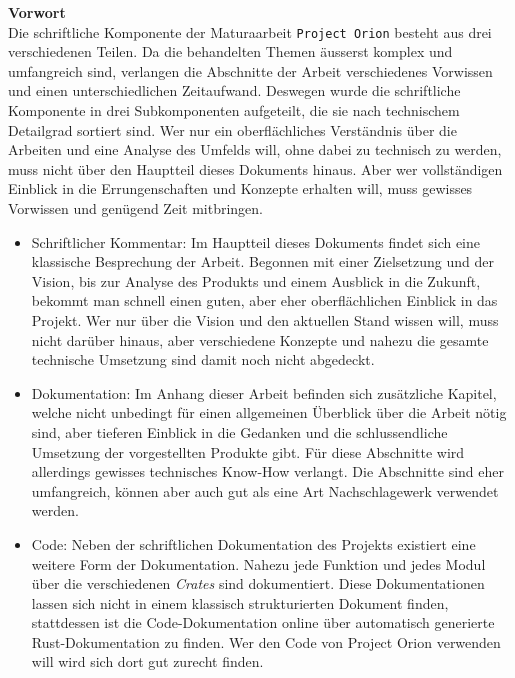 \documentclass[a4paper,11pt,titlepage,twoside]{memoir}
\begin{document}
\textbf{Vorwort}\\
Die schriftliche Komponente der Maturaarbeit \texttt{Project Orion} besteht aus
drei verschiedenen Teilen. Da die behandelten Themen äusserst komplex
und umfangreich sind, verlangen die Abschnitte der Arbeit
verschiedenes Vorwissen und einen unterschiedlichen Zeitaufwand.
Deswegen wurde die schriftliche Komponente in drei Subkomponenten
aufgeteilt, die sie nach technischem Detailgrad sortiert sind. Wer nur
ein oberflächliches Verständnis über die Arbeiten und eine Analyse des
Umfelds will, ohne dabei zu technisch zu werden, muss nicht über den
Hauptteil dieses Dokuments hinaus. Aber wer vollständigen Einblick in
die Errungenschaften und Konzepte erhalten will, muss gewisses
Vorwissen und genügend Zeit mitbringen.
\begin{itemize}
\item Schriftlicher Kommentar: Im Hauptteil dieses Dokuments findet sich
eine klassische Besprechung der Arbeit. Begonnen mit einer
Zielsetzung und der Vision, bis zur Analyse des Produkts und einem
Ausblick in die Zukunft, bekommt man schnell einen guten, aber eher
oberflächlichen Einblick in das Projekt. Wer nur über die Vision und
den aktuellen Stand wissen will, muss nicht darüber hinaus, aber
verschiedene Konzepte und nahezu die gesamte technische Umsetzung
sind damit noch nicht abgedeckt.
\item Dokumentation: Im Anhang dieser Arbeit befinden sich zusätzliche
Kapitel, welche nicht unbedingt für einen allgemeinen Überblick über
die Arbeit nötig sind, aber tieferen Einblick in die Gedanken und
die schlussendliche Umsetzung der vorgestellten Produkte gibt. Für
diese Abschnitte wird allerdings gewisses technisches Know-How
verlangt. Die Abschnitte sind eher umfangreich, können aber auch gut
als eine Art Nachschlagewerk verwendet werden.
\item Code: Neben der schriftlichen Dokumentation des Projekts existiert
eine weitere Form der Dokumentation. Nahezu jede Funktion und jedes
Modul über die verschiedenen \emph{Crates} sind dokumentiert. Diese
Dokumentationen lassen sich nicht in einem klassisch strukturierten
Dokument finden, stattdessen ist die Code-Dokumentation online über
automatisch generierte Rust-Dokumentation zu finden. Wer den Code
von Project Orion verwenden will wird sich dort gut zurecht finden.
\end{itemize}


\noindent 
\newpage
\end{document}

